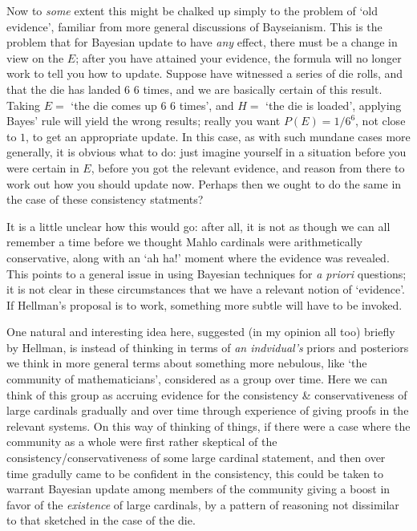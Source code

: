 \documentclass{amsart}
\theoremstyle{definition}
\begin{document}
Now to \emph{some} extent this might be chalked up simply to the problem of 
`old evidence', familiar from more general discussions of Bayseianism. This is the 
problem that for Bayesian update to have \emph{any} effect, there must be a 
change in view on the $E$; after you have attained your evidence,
the formula will no longer work to tell you how to update.
Suppose have witnessed a series of 
die rolls, and that the die has landed 6 6 times, and we are 
basically certain of this result. Taking $E =$ 
`the die comes up 6 6 times', and 
$H =$ `the die is loaded', applying 
Bayes' rule will yield the wrong results; really you want $P(E) = 1/6^6$, 
not close to $1$, to get an appropriate update. 
In this case, as with such mundane cases more generally, 
it is obvious what to do: just imagine yourself in a situation before you were 
certain in $E$, before you got the relevant evidence, and reason from there to work
out how you should update now. Perhaps then we ought to do the same in the case 
of these consistency statments?

It is a little unclear how this would go: after all, it 
is not as though we can all remember a time before we thought Mahlo cardinals 
were arithmetically conservative, along with an `ah ha!' moment where the evidence was revealed. 
This points to a general issue in using 
Bayesian techniques for \emph{a priori} questions; it is not clear in 
these circumstances that we have a relevant notion of `evidence'.
If Hellman's proposal is to work, something more subtle will have to be invoked.

One natural and interesting idea here, suggested (in my opinion all too) 
briefly by Hellman, is instead of thinking in terms of \emph{an indvidual's} priors 
and posteriors we think in more general terms about
something more nebulous, like `the community of mathematicians', considered as a 
group over time. Here we can think of this group as accruing evidence for the 
consistency \& conservativeness of large cardinals gradually and over time through experience
of giving proofs in the relevant systems. On this way of thinking of things, if there 
were a case where the community as a whole were first rather skeptical of the 
consistency/conservativeness of some large cardinal statement, and then over time gradully came to 
be confident in the consistency, this could be taken to warrant Bayesian update 
among members of the community giving a boost in favor of the \emph{existence} of 
large cardinals, by a pattern of reasoning not dissimilar to that sketched in the case of the 
die.
\end{document}

